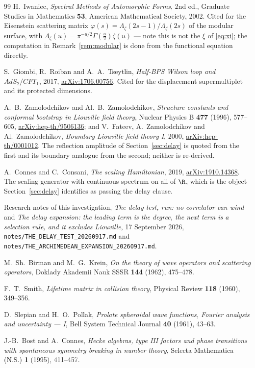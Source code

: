 \begin{thebibliography}{99}
H.~Iwaniec, \emph{Spectral Methods of Automorphic Forms}, 2nd ed., Graduate
Studies in Mathematics \textbf{53}, American Mathematical Society, 2002. Cited for
the Eisenstein scattering matrix
$\varphi(s)=\Lambda_\zeta(2s-1)/\Lambda_\zeta(2s)$ of the modular surface, with
$\Lambda_\zeta(u)=\pi^{-u/2}\Gamma(\frac u2)\zeta(u)$ --- note this is not the
$\xi$ of \eqref{eq:xi}; the computation in Remark~\ref{rem:modular} is done from
the functional equation directly.

S.~Giombi, R.~Roiban and A.~A.~Tseytlin, \emph{Half-BPS Wilson loop and
$AdS_2/CFT_1$}, 2017, \href{https://arxiv.org/abs/1706.00756}{arXiv:1706.00756}.
Cited for the displacement supermultiplet and its protected dimensions.

A.~B.~Zamolodchikov and Al.~B.~Zamolodchikov, \emph{Structure constants and
conformal bootstrap in Liouville field theory}, Nuclear Physics B \textbf{477}
(1996), 577--605,
\href{https://arxiv.org/abs/hep-th/9506136}{arXiv:hep-th/9506136}; and
V.~Fateev, A.~Zamolodchikov and Al.~Zamolodchikov, \emph{Boundary Liouville field
theory I}, 2000, \href{https://arxiv.org/abs/hep-th/0001012}{arXiv:hep-th/0001012}.
The reflection amplitude of Section~\ref{sec:delay} is quoted from the first and
its boundary analogue from the second; neither is re-derived.

A.~Connes and C.~Consani, \emph{The scaling Hamiltonian}, 2019,
\href{https://arxiv.org/abs/1910.14368}{arXiv:1910.14368}. The scaling generator
with continuous spectrum on all of $\R$, which is the object
Section~\ref{sec:delay} identifies as passing the delay clause.

Research notes of this investigation, \emph{The delay test, run: no correlator can
wind} and \emph{The delay expansion: the leading term is the degree, the next term
is a selection rule, and it excludes Liouville}, 17 September 2026,
\texttt{notes/THE\_DELAY\_TEST\_20260917.md} and
\texttt{notes/THE\_ARCHIMEDEAN\_EXPANSION\_20260917.md}.

M.~Sh.~Birman and M.~G.~Krein, \emph{On the theory of wave operators and
scattering operators}, Doklady Akademii Nauk SSSR \textbf{144} (1962), 475--478.

F.~T.~Smith, \emph{Lifetime matrix in collision theory}, Physical Review
\textbf{118} (1960), 349--356.

D.~Slepian and H.~O.~Pollak, \emph{Prolate spheroidal wave functions, Fourier
analysis and uncertainty --- I}, Bell System Technical Journal \textbf{40}
(1961), 43--63.

J.-B.~Bost and A.~Connes, \emph{Hecke algebras, type III factors and phase
transitions with spontaneous symmetry breaking in number theory}, Selecta
Mathematica (N.S.) \textbf{1} (1995), 411--457.
\end{thebibliography}

